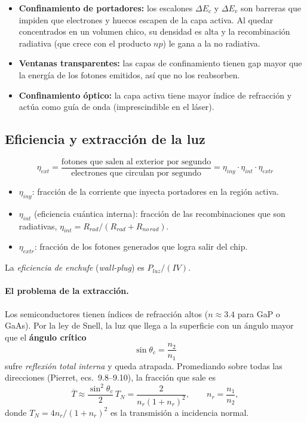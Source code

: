 \begin{itemize}
  \item \textbf{Confinamiento de portadores:} los escalones $\Delta E_c$ y $\Delta E_v$ son
  barreras que impiden que electrones y huecos escapen de la capa activa. Al quedar
  concentrados en un volumen chico, su densidad es alta y la recombinación radiativa (que
  crece con el producto $np$) le gana a la no radiativa.
  \item \textbf{Ventanas transparentes:} las capas de confinamiento tienen gap mayor que la
  energía de los fotones emitidos, así que no los reabsorben.
  \item \textbf{Confinamiento óptico:} la capa activa tiene mayor índice de refracción y
  actúa como guía de onda (imprescindible en el láser).
\end{itemize}

\subsection{Eficiencia y extracción de la luz}

\begin{definicion}
\[
  \eta_{ext} = \frac{\text{fotones que salen al exterior por segundo}}{\text{electrones que circulan por segundo}}
  = \eta_{iny}\cdot\eta_{int}\cdot\eta_{extr}
\]
\begin{itemize}[nosep]
  \item $\eta_{iny}$: fracción de la corriente que inyecta portadores en la región activa.
  \item $\eta_{int}$ (eficiencia cuántica interna): fracción de las recombinaciones que son
  radiativas, $\eta_{int}=R_{rad}/(R_{rad}+R_{no\,rad})$.
  \item $\eta_{extr}$: fracción de los fotones generados que logra salir del chip.
\end{itemize}
La \emph{eficiencia de enchufe} (\emph{wall-plug}) es $P_{luz}/(IV)$.
\end{definicion}

\paragraph{El problema de la extracción.} Los semiconductores tienen índices de refracción
altos ($n\approx3.4$ para GaP o GaAs). Por la ley de Snell, la luz que llega a la
superficie con un ángulo mayor que el \textbf{ángulo crítico}
\[
  \sin\theta_c = \frac{n_2}{n_1}
\]
sufre \emph{reflexión total interna} y queda atrapada. Promediando sobre todas las
direcciones (Pierret, ecs.~9.8--9.10), la fracción que sale es
\[
  \overline{T} \approx \frac{\sin^2\theta_c}{2}\,T_N
  = \frac{2}{n_r(1+n_r)^2},
  \qquad n_r=\frac{n_1}{n_2},
\]
donde $T_N=4n_r/(1+n_r)^2$ es la transmisión a incidencia normal.

